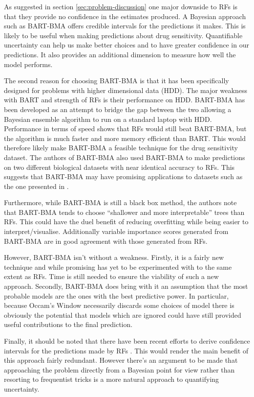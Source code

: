 \documentclass[journal]{IEEEtran}
\begin{document}
As suggested in section \ref{sec:problem-discussion} one major downside to RFs is that they provide no confidence in the estimates produced. A Bayesian approach such as BART-BMA offers credible intervals for the predictions it makes. This is likely to be useful when making predictions about drug sensitivity. Quantifiable uncertainty can help us make better choices and to have greater confidence in our predictions. It also provides an additional dimension to measure how well the model performs.

The second reason for choosing BART-BMA is that it has been specifically designed for problems with higher dimensional data (HDD). The major weakness with BART and strength of RFs is their performance on HDD. BART-BMA has been developed as an attempt to bridge the gap between the two allowing a Bayesian ensemble algorithm to run on a standard laptop with HDD. Performance in terms of speed shows that RFs would still beat BART-BMA, but the algorithm is much faster and more memory efficient than BART. This would therefore likely make BART-BMA a feasible technique for the drug sensitivity dataset. The authors of BART-BMA also used BART-BMA to make predictions on two different biological datasets with near identical accuracy to RFs. This suggests that BART-BMA may have promising applications to datasets such as the one presented in \cite{riddick2011predicting}.

Furthermore, while BART-BMA is still a black box method, the authors note that BART-BMA tends to choose ``shallower and more interpretable'' \cite{hernandez2015bayesian} trees than RFs. This could have the duel benefit of reducing overfitting while being easier to interpret/visualise. Additionally variable importance scores generated from BART-BMA are in good agreement with those generated from RFs.

However, BART-BMA isn't without a weakness. Firstly, it is a fairly new technique and while promising has yet to be experimented with to the same extent as RFs. Time is still needed to ensure the viability of such a new approach. Secondly, BART-BMA does bring with it an assumption that the most probable models are the ones with the best predictive power. In particular, because Occam's Window necessarily discards some choices of model there is obviously the potential that models which are ignored could have still provided useful contributions to the final prediction.

Finally, it should be noted that there have been recent efforts to derive confidence intervals for the predictions made by RFs \cite{wager2014confidence}. This would render the main benefit of this approach fairly redundant. However there's an argument to be made that approaching the problem directly from a Bayesian point for view rather than resorting to  frequentist tricks is a more natural approach to quantifying uncertainty.
\end{document}
